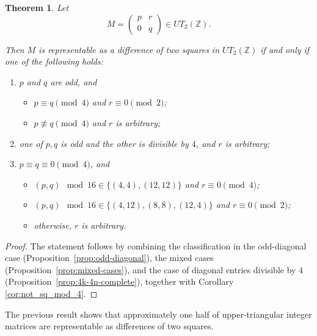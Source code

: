 \documentclass[11pt]{amsart}
\newtheorem{theorem}{Theorem}%
\def\Z{\mathbb{Z}}
\begin{document}
\begin{theorem}\label{thm:final-classification}
Let
$$M=\begin{pmatrix}p&r\\0&q\end{pmatrix}\in UT_2(\Z).$$

Then $M$ is representable as a difference of two squares in $UT_2(\Z)$ if and only if one of the following holds:
\begin{enumerate}
\item $p$ and $q$ are odd, and
\begin{itemize}
\item  $p\equiv q\pmod4$ and $r\equiv0\pmod2$;
\item $p\not\equiv q\pmod4$ and $r$ is arbitrary;
\end{itemize}
\item one of $p,q$ is odd and the other is divisible by $4$, and $r$ is arbitrary;
\item $p\equiv q\equiv0\pmod4$, and
\begin{itemize}
\item $(p,q)\mod16\in\{(4,4),(12,12)\}$ and $r\equiv0\pmod4$;
\item $(p,q)\mod16\in\{(4,12),(8,8),(12,4)\}$ and $r\equiv0\pmod2$;
\item otherwise, $r$ is arbitrary.
\end{itemize}
\end{enumerate}
\end{theorem}

\begin{proof}
The statement follows by combining the classification in the odd-diagonal case (Proposition~\ref{prop:odd-diagonal}), the mixed cases (Proposition~\ref{prop:mixed-cases}), and the case of diagonal entries divisible by $4$ (Proposition~\ref{prop:4k-4n-complete}), together  with Corollary \ref{cor:not_sq_mod_4}.
\end{proof}

The previous result shows that approximately one half of upper-triangular integer matrices are representable as differences of two squares.
\end{document}
